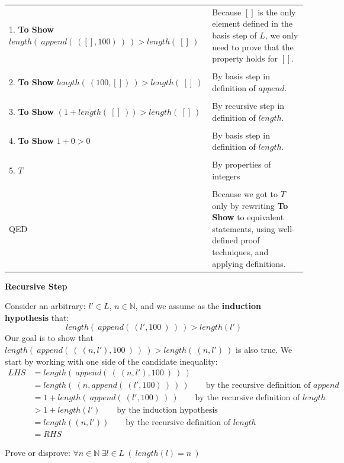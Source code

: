 \documentclass[12pt, oneside]{article}
\begin{document}
    \begin{tabular}{l p{3.5in}}
     1. \textbf{To Show} $length(~append(~([], 100)~)~) > length(~[]~)$
    & Because $[]$ is the only element defined in the basis step of $L$, 
    we only need to prove that the property holds for $[]$.\\
    &  \\
     2. \textbf{To Show} $length(~(100,[])~) > length(~[]~)$
    &  By basis step in definition of $append$.\\
    &  \\
     3. \textbf{To Show} $(1 +length(~[]~)) > length(~[]~)$
    &  By recursive step in definition of $length$.\\
    &  \\    
     4. \textbf{To Show} $1+0 > 0$
    &  By basis step in definition of $length$.\\
    &  \\    
    5. $T$
    & By properties of integers \\
    &  \\    
    QED & Because we got to $T$ only by rewriting \textbf{To Show} to equivalent statements, using well-defined proof techniques, and applying definitions. \\
    \end{tabular}

{\bf Recursive Step}

Consider an arbitrary: $l' \in L$, $n \in \mathbb{N}$, and we  assume
as the {\bf induction hypothesis} that:
\[
length(~append(~(l', 100~)~)~) > length(l')
\]
Our goal is to show that $length(~append( ~(~(n,l'), 100~)~)~) > length(~(n,l')~)$ is also true. 
We start by working with
one side of the candidate inequality:
\begin{align*}
LHS &= length(~append( ~(~ (n,l'), 100~)~)~) \\
&= length(~(n, append(~(l', 100)~)~ )~) \qquad \text{by the recursive definition of $append$}\\
&= 1 + length(~ append(~(l', 100)~) ~) \qquad \text{by the recursive definition of $length$}\\
&> 1+ length(l')  \qquad \text{by the induction hypothesis}\\
&= length( (n,l') )  \qquad \text{by the recursive definition of $length$}\\
&= RHS 
\end{align*} \newpage


Prove or disprove: $\forall n \in \mathbb{N} ~\exists l \in L ~(~length(l) = n~)$
\end{document}
